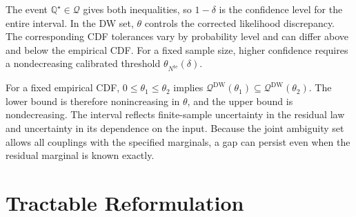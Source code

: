 \documentclass[review,11pt,3p,authoryear,nopreprintline]{elsarticle}
\begin{document}
The event $\mathbb Q^\star\in\mathscr Q$ gives both inequalities, so $1-\delta$ is the confidence level for the entire interval. In the DW set, $\theta$ controls the corrected likelihood discrepancy. The corresponding CDF tolerances vary by probability level and can differ above and below the empirical CDF. For a fixed sample size, higher confidence requires a nondecreasing calibrated threshold $\theta_{N^{\mathrm{te}}}(\delta)$.

For a fixed empirical CDF, $0\le\theta_1\le\theta_2$ implies $\mathscr Q^{\mathrm{DW}}(\theta_1)\subseteq\mathscr Q^{\mathrm{DW}}(\theta_2)$. The lower bound is therefore nonincreasing in $\theta$, and the upper bound is nondecreasing. The interval reflects finite-sample uncertainty in the residual law and uncertainty in its dependence on the input. Because the joint ambiguity set allows all couplings with the specified marginals, a gap can persist even when the residual marginal is known exactly.

\section{Tractable Reformulation}
\label{sec-reformulation}



\end{document}
